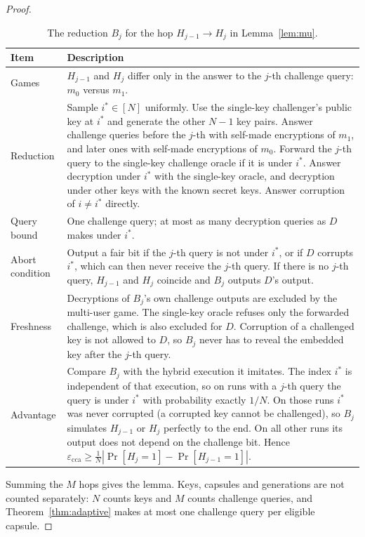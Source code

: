 \documentclass[pdflatex,sn-mathphys-num]{sn-jnl}
\theoremstyle{plain}
\theoremstyle{definition}
\begin{document}
\begin{proof}
\begin{table}[htbp]
\caption{The reduction $B_j$ for the hop $H_{j-1}\to H_j$ in Lemma~\ref{lem:mu}.}\label{tab:mu}
\centering\footnotesize
\begin{tabularx}{\linewidth}{@{}p{.18\linewidth}Y@{}}\toprule
Item & Description\\\midrule
Games & $H_{j-1}$ and $H_j$ differ only in the answer to the $j$-th challenge query: $m_0$ versus $m_1$.\\
Reduction & Sample $i^*\in[N]$ uniformly. Use the single-key challenger's public key at $i^*$ and generate the other $N-1$ key pairs. Answer challenge queries before the $j$-th with self-made encryptions of $m_1$, and later ones with self-made encryptions of $m_0$. Forward the $j$-th query to the single-key challenge oracle if it is under $i^*$. Answer decryption under $i^*$ with the single-key oracle, and decryption under other keys with the known secret keys. Answer corruption of $i\ne i^*$ directly.\\
Query bound & One challenge query; at most as many decryption queries as $D$ makes under $i^*$.\\
Abort condition & Output a fair bit if the $j$-th query is not under $i^*$, or if $D$ corrupts $i^*$, which can then never receive the $j$-th query. If there is no $j$-th query, $H_{j-1}$ and $H_j$ coincide and $B_j$ outputs $D$'s output.\\
Freshness & Decryptions of $B_j$'s own challenge outputs are excluded by the multi-user game. The single-key oracle refuses only the forwarded challenge, which is also excluded for $D$. Corruption of a challenged key is not allowed to $D$, so $B_j$ never has to reveal the embedded key after the $j$-th query.\\
Advantage & Compare $B_j$ with the hybrid execution it imitates. The index $i^*$ is independent of that execution, so on runs with a $j$-th query the query is under $i^*$ with probability exactly $1/N$. On those runs $i^*$ was never corrupted (a corrupted key cannot be challenged), so $B_j$ simulates $H_{j-1}$ or $H_j$ perfectly to the end. On all other runs its output does not depend on the challenge bit. Hence $\varepsilon_{\mathrm{cca}}\ge\frac1N|\Pr[H_j=1]-\Pr[H_{j-1}=1]|$.\\\bottomrule
\end{tabularx}
\end{table}

Summing the $M$ hops gives the lemma. Keys, capsules and generations are not counted separately: $N$ counts keys and $M$ counts challenge queries, and Theorem~\ref{thm:adaptive} makes at most one challenge query per eligible capsule.
\end{proof}
\end{document}
